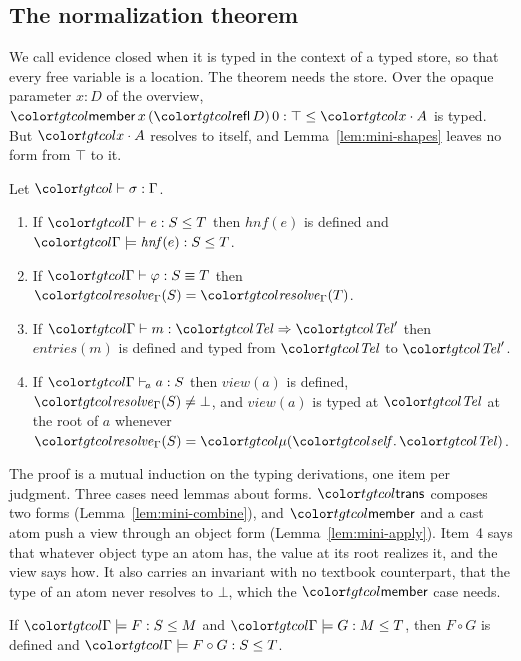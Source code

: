 \FloatBarrier
\subsection{The normalization theorem}\label{sec:mini-theorem}

We call evidence closed when it is typed in the context of a typed store, so that every free variable is a location. The theorem needs the store. Over the opaque parameter $x : D$ of the overview, $\ev{member}\,x\,(\ev{refl}\,D)\,0 : \top \le \sel{x}{A}$ is typed. But $\sel{x}{A}$ resolves to itself, and Lemma~\ref{lem:mini-shapes} leaves no form from $\top$ to it.

\begin{theorem}\label{thm:mini-canon}
Let $\storej{\sigma}{\Gamma}$.
\begin{enumerate}
\item If $\lej{\Gamma}{e}{S}{T}$ then $\mathit{hnf}(e)$ is defined and $\formj{\Gamma}{\mathit{hnf}(e)}{S}{T}$.
\item If $\eqj{\Gamma}{\varphi}{S}{T}$ then $\resolve{\Gamma}{S} = \resolve{\Gamma}{T}$.
\item If $\morj{\Gamma}{m}{\tel}{\tel'}$ then $\mathit{entries}(m)$ is defined and typed from $\tel$ to $\tel'$.
\item If $\atomj{\Gamma}{a}{S}$ then $\mathit{view}(a)$ is defined, $\resolve{\Gamma}{S} \neq \bot$, and $\mathit{view}(a)$ is typed at $\tel$ at the root of $a$ whenever $\resolve{\Gamma}{S} = \obj{\tel}$.
\end{enumerate}
\end{theorem}

The proof is a mutual induction on the typing derivations, one item per judgment. Three cases need lemmas about forms. $\ev{trans}$ composes two forms (Lemma~\ref{lem:mini-combine}), and $\ev{member}$ and a cast atom push a view through an object form (Lemma~\ref{lem:mini-apply}). Item~4 says that whatever object type an atom has, the value at its root realizes it, and the view says how. It also carries an invariant with no textbook counterpart, that the type of an atom never resolves to $\bot$, which the $\ev{member}$ case needs.

\begin{lemma}[Composition]\label{lem:mini-combine}
If $\formj{\Gamma}{F}{S}{M}$ and $\formj{\Gamma}{G}{M}{T}$, then $F \circ G$ is defined and $\formj{\Gamma}{F \circ G}{S}{T}$.
\end{lemma}

